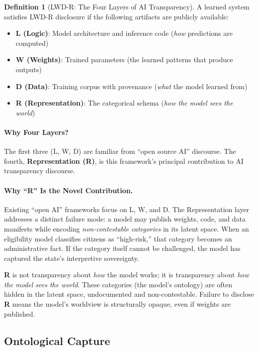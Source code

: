 \documentclass[11pt,a4paper]{article}
\theoremstyle{definition}
\newtheorem{definition}{Definition}[section]
\begin{document}
\begin{definition}[LWD-R: The Four Layers of AI Transparency]
\label{def:lwdr}
A learned system satisfies LWD-R disclosure if the following artifacts are publicly available:
\begin{itemize}[noitemsep]
    \item \textbf{L (Logic)}: Model architecture and inference code (\textit{how} predictions are computed)
    \item \textbf{W (Weights)}: Trained parameters (the learned patterns that produce outputs)
    \item \textbf{D (Data)}: Training corpus with provenance (\textit{what} the model learned from)
    \item \textbf{R (Representation)}: The categorical schema (\textit{how the model sees the world})
\end{itemize}
\end{definition}

\paragraph{Why Four Layers?} The first three (L, W, D) are familiar from ``open source AI'' discourse. The fourth, \textbf{Representation (R)}, is this framework's principal contribution to AI transparency discourse.

\paragraph{Why ``R'' Is the Novel Contribution.} Existing ``open AI'' frameworks focus on L, W, and D. The Representation layer addresses a distinct failure mode: a model may publish weights, code, and data manifests while encoding \textit{non-contestable categories} in its latent space. When an eligibility model classifies citizens as ``high-risk,'' that category becomes an administrative fact. If the category itself cannot be challenged, the model has captured the state's interpretive sovereignty.

\textbf{R} is not transparency about \textit{how} the model works; it is transparency about \textit{how the model sees the world}. These categories (the model's ontology) are often hidden in the latent space, undocumented and non-contestable. Failure to disclose \textbf{R} means the model's worldview is structurally opaque, even if weights are published.

\subsection{Ontological Capture}
\label{subsec:rcr}
\end{document}
